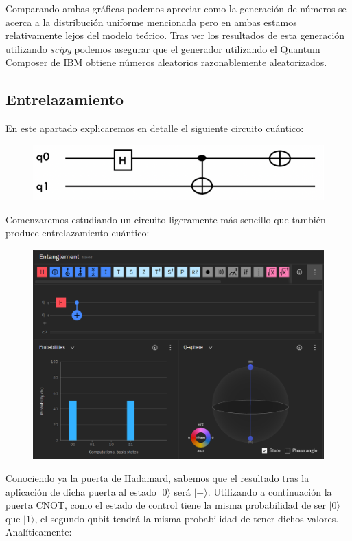 \documentclass[11pt]{article}
\newcommand{\ra}{\rangle}
\newcommand{\ra}{\rangle}
\begin{document}
Comparando ambas gráficas podemos apreciar como la generación de números se acerca a la distribución uniforme mencionada pero en ambas estamos relativamente lejos del modelo teórico. Tras ver los resultados de esta generación utilizando \emph{scipy} podemos asegurar que el generador utilizando el Quantum Composer de IBM obtiene números aleatorios razonablemente aleatorizados.


\subsection{Entrelazamiento}


En este apartado explicaremos en detalle el siguiente circuito cuántico:

\begin{figure}[H]
	\centering
	\includegraphics[scale=0.8]{figures/entanglement_statement.png}
\end{figure}

Comenzaremos estudiando un circuito ligeramente más sencillo que también produce entrelazamiento cuántico:

\begin{figure}[H]
	\centering
	\includegraphics[scale=0.8]{figures/entanglement.png}
\end{figure}

Conociendo ya la puerta de Hadamard, sabemos que el resultado tras la aplicación de dicha puerta al estado $|0\ra$ será $|+\ra$. Utilizando a continuación la puerta CNOT, como el estado de control tiene la misma probabilidad de ser $|0\ra$ que $|1\ra$, el segundo qubit tendrá la misma probabilidad de tener dichos valores. Analíticamente:
\end{document}
